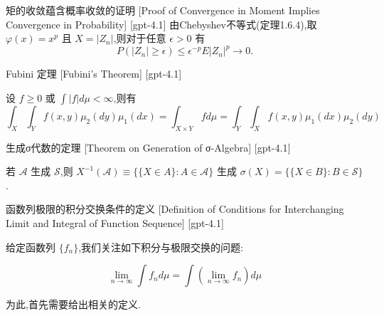 \documentclass[UTF8]{ctexart}
\begin{document}
    
    
    \begin{prf}
        {矩的收敛蕴含概率收敛的证明}
        [Proof of Convergence in Moment Implies Convergence in Probability]
        [gpt-4.1]
        由Chebyshev不等式(定理1.6.4),取 $\varphi(x) = x^p$ 且 $X = |Z_n|$,则对于任意 $\epsilon > 0$ 有
\[
P(|Z_n| \ge \epsilon) \le \epsilon^{-p} E|Z_n|^p \to 0.
\]

    \end{prf}
    
    
    
    \begin{thm}
        {Fubini 定理}
        [Fubini's Theorem]
        [gpt-4.1]
        
设 $f \geq 0$ 或 $\int |f| d\mu < \infty$,则有
\[
\int_{X} \int_{Y} f(x, y) \mu_{2}(dy) \mu_{1}(dx) = \int_{X \times Y} f d\mu = \int_{Y} \int_{X} f(x, y) \mu_{1}(dx) \mu_{2}(dy)
\]

    \end{thm}
    
    
    
    \begin{thm}
        {生成σ代数的定理}
        [Theorem on Generation of σ-Algebra]
        [gpt-4.1]
        
若 $\mathcal{A}$ 生成 $\boldsymbol{\mathcal{S}}$,则 $X^{-1}( \mathcal{A} ) \equiv \{ \{ X \in A \} : A \in \mathcal{A} \}$ 生成 $\sigma(X) = \{ \{ X \in B \} : B \in \mathcal{S} \}$.

    \end{thm}
    
    
    
    \begin{dfn}
        {函数列极限的积分交换条件的定义}
        [Definition of Conditions for Interchanging Limit and Integral of Function Sequence]
        [gpt-4.1]
        
给定函数列 $\{f_n\}$,我们关注如下积分与极限交换的问题:

\[
\lim_{n \to \infty} \int f_{n} d\mu = \int \left( \lim_{n \to \infty} f_{n} \right) d\mu
\]

为此,首先需要给出相关的定义.

    \end{dfn}
    
\end{document}
